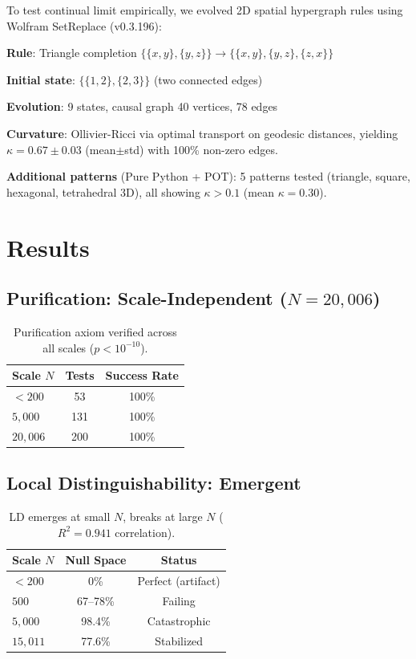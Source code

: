 \documentclass[11pt]{article}
\theoremstyle{definition}
\theoremstyle{remark}
\begin{document}
To test continual limit empirically, we evolved 2D spatial hypergraph rules using Wolfram SetReplace (v0.3.196):

\textbf{Rule}: Triangle completion $\{\{x,y\},\{y,z\}\} \to \{\{x,y\},\{y,z\},\{z,x\}\}$

\textbf{Initial state}: $\{\{1,2\},\{2,3\}\}$ (two connected edges)

\textbf{Evolution}: 9 states, causal graph 40 vertices, 78 edges

\textbf{Curvature}: Ollivier-Ricci via optimal transport on geodesic distances, yielding $\kappa=0.67\pm0.03$ (mean$\pm$std) with 100\% non-zero edges.

\textbf{Additional patterns} (Pure Python + POT): 5 patterns tested (triangle, square, hexagonal, tetrahedral 3D), all showing $\kappa>0.1$ (mean $\kappa=0.30$).

\section{Results}

\subsection{Purification: Scale-Independent ($N=20{,}006$)}

\begin{table}[h]
\centering
\begin{tabular}{lcc}
\hline
Scale $N$ & Tests & Success Rate \\
\hline
$<200$ & 53 & 100\% \\
$5{,}000$ & 131 & 100\% \\
$20{,}006$ & 200 & 100\% \\
\hline
\end{tabular}
\caption{Purification axiom verified across all scales ($p<10^{-10}$).}
\end{table}

\subsection{Local Distinguishability: Emergent}

\begin{table}[h]
\centering
\begin{tabular}{lcc}
\hline
Scale $N$ & Null Space & Status \\
\hline
$<200$ & 0\% & Perfect (artifact) \\
$500$ & 67--78\% & Failing \\
$5{,}000$ & 98.4\% & Catastrophic \\
$15{,}011$ & 77.6\% & Stabilized \\
\hline
\end{tabular}
\caption{LD emerges at small $N$, breaks at large $N$ ($R^2=0.941$ correlation).}
\end{table}
\end{document}

